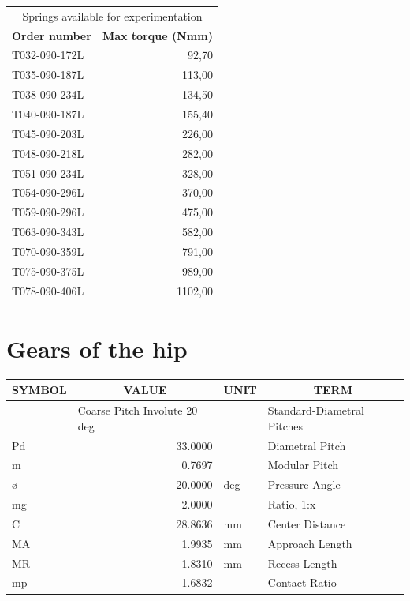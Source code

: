 \begin{appendices}
        \begin{table}[htbp]
        \centering
        \begin{tabular}{l|r}
        \multicolumn{2}{c}{\Large Springs available for experimentation} \\
        \multicolumn{1}{c}{\textbf{Order number}} & \multicolumn{1}{c|}{\textbf{Max torque (Nmm)}} \\ \hline
        T032-090-172L & 92,70   \\ \hline
        T035-090-187L & 113,00  \\ \hline
        T038-090-234L  & 134,50 \\ \hline
        T040-090-187L & 155,40  \\ \hline
        T045-090-203L & 226,00  \\ \hline
        T048-090-218L & 282,00  \\ \hline
        T051-090-234L & 328,00  \\ \hline
        T054-090-296L & 370,00  \\ \hline
        T059-090-296L & 475,00  \\ \hline
        T063-090-343L & 582,00  \\ \hline
        T070-090-359L & 791,00  \\ \hline
        T075-090-375L & 989,00  \\ \hline
        T078-090-406L & 1102,00 \\ 
        \end{tabular}
        \label{tab:available_springs_2}
        \end{table}


    \newpage \mbox{}
    \section{Gears of the hip}
    \label{app:hip_gears}
    \begin{center}
    \begin{tabular}{|l|r|l|l|}
    \hline
    \multicolumn{1}{|c|}{\textbf{SYMBOL}} & \multicolumn{1}{c|}{\textbf{VALUE}} & \multicolumn{1}{c|}{\textbf{UNIT}} & \multicolumn{1}{c|}{\textbf{TERM}} \\ \hline
     & \multicolumn{1}{l|}{Coarse Pitch Involute 20 deg} &  & Standard-Diametral Pitches \\ \hline
    Pd & 33.0000 &  & Diametral Pitch \\ \hline
    m & 0.7697 &  & Modular Pitch \\ \hline
    ø & 20.0000 & deg & Pressure Angle \\ \hline
    mg & 2.0000 &  & Ratio, 1:x \\ \hline
    C & 28.8636 & mm & Center Distance \\ \hline
    MA & 1.9935 & mm & Approach Length \\ \hline
    MR & 1.8310 & mm & Recess Length \\ \hline
    mp & 1.6832 &  & Contact Ratio \\ \hline
    \end{tabular}
    \end{center}


\end{appendices}
